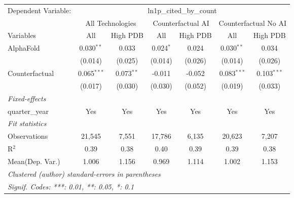 \begingroup
\centering
\begin{tabular}{lcccccc}
   \tabularnewline \midrule \midrule
   Dependent Variable: & \multicolumn{6}{c}{ln1p\_cited\_by\_count}\\
 & \multicolumn{2}{c}{All Technologies} & \multicolumn{2}{c}{Counterfactual AI} & \multicolumn{2}{c}{Counterfactual No AI} \\
\cmidrule(lr){1-1}\cmidrule(lr){2-3} \cmidrule(lr){4-5} \cmidrule(lr){6-7}
Variables & \multicolumn{1}{c}{All} & \multicolumn{1}{c}{High PDB} & \multicolumn{1}{c}{All} & \multicolumn{1}{c}{High PDB} & \multicolumn{1}{c}{All} & \multicolumn{1}{c}{High PDB} \\
\cmidrule(lr){1-1}\cmidrule(lr){2-2} \cmidrule(lr){3-3} \cmidrule(lr){4-4} \cmidrule(lr){5-5} \cmidrule(lr){6-6} \cmidrule(lr){7-7}
   AlphaFold      & 0.030$^{**}$  & 0.033        & 0.024$^{*}$ & 0.024   & 0.030$^{**}$  & 0.034\\   
                  & (0.014)       & (0.025)      & (0.014)     & (0.026) & (0.014)       & (0.026)\\   
   Counterfactual & 0.065$^{***}$ & 0.073$^{**}$ & -0.011      & -0.052  & 0.083$^{***}$ & 0.103$^{***}$\\   
                  & (0.017)       & (0.030)      & (0.030)     & (0.052) & (0.019)       & (0.033)\\   
   \midrule
   \emph{Fixed-effects}\\
   quarter\_year  & Yes           & Yes          & Yes         & Yes     & Yes           & Yes\\  
   \midrule
   \emph{Fit statistics}\\
   Observations   & 21,545        & 7,551        & 17,786      & 6,135   & 20,623        & 7,207\\  
   R$^2$          & 0.39          & 0.38         & 0.40        & 0.39    & 0.39          & 0.38\\  
Mean(Dep. Var.) & 1.006 & 1.156 & 0.969 & 1.114 & 1.002 & 1.153 \\
   \midrule \midrule
   \multicolumn{7}{l}{\emph{Clustered (author) standard-errors in parentheses}}\\
   \multicolumn{7}{l}{\emph{Signif. Codes: ***: 0.01, **: 0.05, *: 0.1}}\\
\end{tabular}
\par\endgroup

